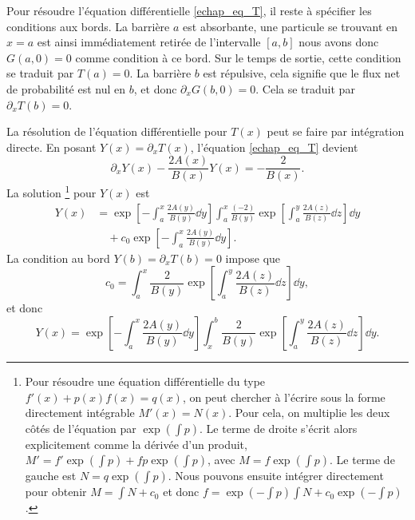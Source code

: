 \documentclass[openany,a4paper,12pt]{article}
\begin{document}
\par Pour résoudre l'équation différentielle \ref{echap_eq_T}, il reste à spécifier les conditions aux bords. La barrière $a$ est absorbante, une particule se trouvant en $x=a$ est ainsi immédiatement retirée de l'intervalle $[a,b]$ nous avons donc $G(a,0)=0$ comme condition à ce bord. Sur le temps de sortie, cette condition se traduit par $T(a)=0$. La barrière $b$ est répulsive, cela signifie que le flux net de probabilité est nul en $b$, et donc $\partial_x G(b,0) = 0$. Cela se traduit par $\partial_x T(b) = 0$.

\par La résolution de l'équation différentielle pour $T(x)$ peut se faire par intégration directe. En posant $Y(x) = \partial_x T(x)$, l'équation \ref{echap_eq_T} devient 
%
\begin{equation}\label{echap_eq_T_int_directe}
	\partial_x Y(x) - \frac{2A(x)}{B(x)} Y(x) = -\frac{2}{B(x)}.
\end{equation}
%
La solution
\footnote{
	Pour résoudre une équation différentielle du type $f'(x)+p(x)f(x)=q(x)$, on peut chercher à l'écrire sous la forme directement intégrable $M'(x) = N(x)$. Pour cela, on multiplie les deux côtés de l'équation par $\exp(\int p)$. Le terme de droite s'écrit alors explicitement comme la dérivée d'un produit, $M' = f'\exp(\int p) + f p \exp(\int p)$, avec $M = f\exp(\int p)$. Le terme de gauche est $N = q \exp(\int p)$. Nous pouvons ensuite intégrer directement pour obtenir $M = \int N + c_0$ et donc $f = \exp(-\int p) \int N + c_0 \exp(-\int p)$.
}
pour $Y(x)$ est 
%
\begin{equation}\label{echap_sol_Y_avec_c0}
\begin{split}
	Y(x) &= \exp\left[ - \int_a^x \frac{2 A(y)}{B(y)} \dd y \right]
	\int_a^x \frac{(-2)}{B(y)} \exp\left[ \int_a^y \frac{2 A(z)}{B(z)} \dd z\right] \dd y \\
	&\quad + c_0 \exp\left[ - \int_a^x \frac{2 A(y)}{B(y)} \dd y \right].
\end{split}	
\end{equation}
%
La condition au bord $Y(b)=\partial_x T(b)=0$ impose que 
%
\begin{equation}\label{echap_sol_Y_bord_b}
	c_0 = \int_a^x \frac{2}{B(y)} \exp\left[ \int_a^y \frac{2 A(z)}{B(z)} \dd z\right] \dd y,
\end{equation}
%
et donc
%
\begin{equation}\label{echap_sol_Y_sans_c0}
	Y(x) = \exp\left[ - \int_a^x \frac{2 A(y)}{B(y)} \dd y \right]
	\int_x^b \frac{2}{B(y)} \exp\left[ \int_a^y \frac{2 A(z)}{B(z)} \dd z\right] \dd y.
\end{equation}
\end{document}
